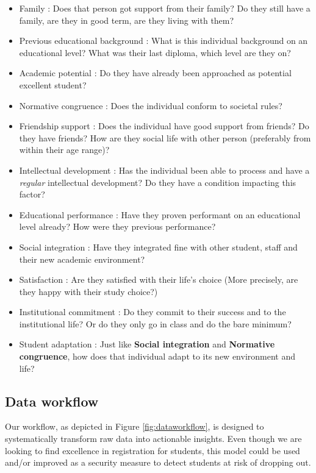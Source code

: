 \documentclass[../main.tex]{subfiles}
\begin{document}
\begin{itemize}
    \item Family : Does that person got support from their family? Do they still have a family, are they in good term, are they living with them?
    \item Previous educational background : What is this individual background on an educational level? What was their last diploma, which level are they on? 
    \item Academic potential : Do they have already been approached as potential excellent student?
    \item Normative congruence : Does the individual conform to societal rules? 
    \item Friendship support : Does the individual have good support from friends? Do they have friends? How are they social life with other person (preferably from within their age range)?
    \item Intellectual development : Has the individual been able to process and have a \textit{regular} intellectual development? Do they have a condition impacting this factor? 
    \item Educational performance : Have they proven performant on an educational level already? How were they previous performance?
    \item Social integration : Have they integrated fine with other student, staff and their new academic environment?
    \item Satisfaction : Are they satisfied with their life's choice (More precisely, are they happy with their study choice?)
    \item Institutional commitment : Do they commit to their success and to the institutional life? Or do they only go in class and do the bare minimum?
    \item Student adaptation : Just like \textbf{Social integration} and \textbf{Normative congruence}, how does that individual adapt to its new environment and life?
\end{itemize}


\subsection{Data workflow}
\label{subsec:concimp_dataworkflow}
Our workflow, as depicted in Figure \ref{fig:dataworkflow}, is designed to systematically transform raw data into actionable insights. Even though we are looking to find excellence in registration for students, this model could be used and/or improved as a security measure to detect students at risk of dropping out.
\end{document}
